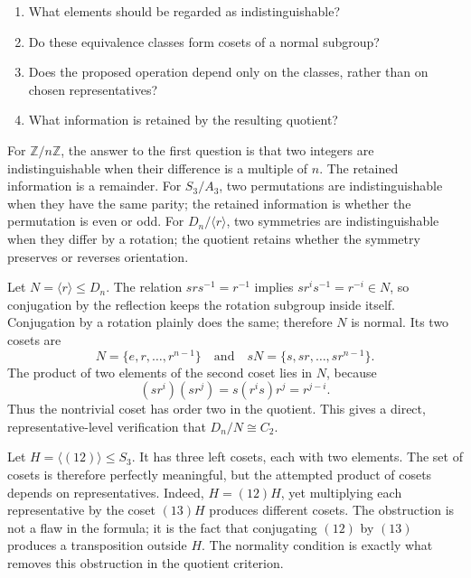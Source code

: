 \begin{enumerate}
\item What elements should be regarded as indistinguishable?
\item Do these equivalence classes form cosets of a normal subgroup?
\item Does the proposed operation depend only on the classes, rather than on
      chosen representatives?
\item What information is retained by the resulting quotient?
\end{enumerate}

For \(\mathbb Z/n\mathbb Z\), the answer to the first question is that two
integers are indistinguishable when their difference is a multiple of \(n\).
The retained information is a remainder.  For \(S_3/A_3\), two permutations are
indistinguishable when they have the same parity; the retained information is
whether the permutation is even or odd.  For \(D_n/\langle r\rangle\), two
symmetries are indistinguishable when they differ by a rotation; the quotient
retains whether the symmetry preserves or reverses orientation.

\begin{example}
Let \(N=\langle r\rangle\leq D_n\).  The relation \(srs^{-1}=r^{-1}\)
implies \(sr^is^{-1}=r^{-i}\in N\), so conjugation by the reflection keeps
the rotation subgroup inside itself.  Conjugation by a rotation plainly does
the same; therefore \(N\) is normal.  Its two cosets are
\[N=\{e,r,\ldots,r^{n-1}\}\quad\text{and}\quad sN=
\{s,sr,\ldots,sr^{n-1}\}.\]
The product of two elements of the second coset lies in \(N\), because
\[(sr^i)(sr^j)=s(r^is)r^j=r^{j-i}.\]
Thus the nontrivial coset has order two
in the quotient.  This gives a direct, representative-level verification that
\(D_n/N\cong C_2\).
\end{example}

\begin{example}
Let \(H=\langle(12)\rangle\leq S_3\).  It has three left cosets, each with two
elements.  The set of cosets is therefore perfectly meaningful, but the
attempted product of cosets depends on representatives.  Indeed, \(H=(12)H\),
yet multiplying each representative by the coset \((13)H\) produces different
cosets.  The obstruction is not a flaw in the formula; it is the fact that
conjugating \((12)\) by \((13)\) produces a transposition outside \(H\).
The normality condition is exactly what removes this obstruction in the
quotient criterion.
\end{example}

